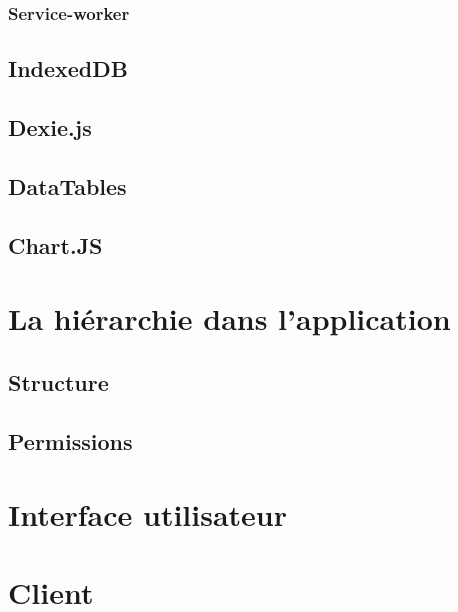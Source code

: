 \documentclass{EPL-master-thesis-covers-FR}
\begin{document}
			\subsubsection*{Service-worker}

		
			\subsection{IndexedDB}

					

			\subsection{Dexie.js}
				

			\subsection{DataTables}

			

			\subsection{Chart.JS}
				
				

		\section{La hiérarchie dans l'application}


			\subsection*{Structure}

			

			\subsection*{Permissions}

			

		\section{Interface utilisateur}

		\section{Client}
\end{document}
